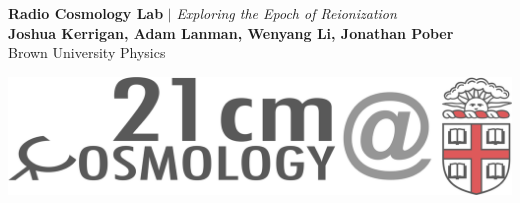 \documentclass[a0,landscape]{a0poster}
\begin{document}


\begin{minipage}[b]{0.5\textwidth}
\veryHuge \color{Brown} \textbf{Radio Cosmology Lab} \color{Black}\textbf{$|$} \color{Black}\LARGE\textit{Exploring the Epoch of Reionization}\\
\huge \textbf{Joshua Kerrigan, Adam Lanman, Wenyang Li, Jonathan Pober}\\ %
\huge Brown University Physics\\ %
\end{minipage}
\begin{minipage}[b]{0.6\linewidth}
\includegraphics[width=45cm]{radiologo.png} %
\end{minipage}

\end{document}

